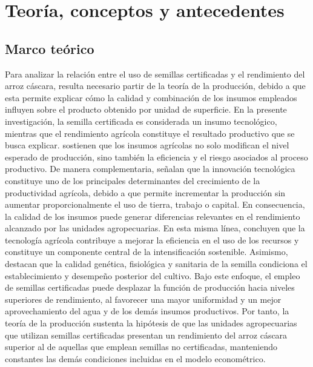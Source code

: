 \documentclass[11pt,a4paper,twocolumn]{article}
\begin{document}
\section{Teoría, conceptos y antecedentes}

\subsection{Marco teórico}
Para analizar la relación entre el uso de semillas certificadas y el rendimiento del arroz cáscara, resulta necesario partir de la teoría de la producción, debido a que esta permite explicar cómo la calidad y combinación de los insumos empleados influyen sobre el producto obtenido por unidad de superficie. En la presente investigación, la semilla certificada es considerada un insumo tecnológico, mientras que el rendimiento agrícola constituye el resultado productivo que se busca explicar. \citet{just1979} sostienen que los insumos agrícolas no solo modifican el nivel esperado de producción, sino también la eficiencia y el riesgo asociados al proceso productivo. De manera complementaria, \citet{alston2021} señalan que la innovación tecnológica constituye uno de los principales determinantes del crecimiento de la productividad agrícola, debido a que permite incrementar la producción sin aumentar proporcionalmente el uso de tierra, trabajo o capital. En consecuencia, la calidad de los insumos puede generar diferencias relevantes en el rendimiento alcanzado por las unidades agropecuarias. En esta misma línea, \citet{li2024} concluyen que la tecnología agrícola contribuye a mejorar la eficiencia en el uso de los recursos y constituye un componente central de la intensificación sostenible. Asimismo, \citet{louwaars2021} destacan que la calidad genética, fisiológica y sanitaria de la semilla condiciona el establecimiento y desempeño posterior del cultivo. Bajo este enfoque, el empleo de semillas certificadas puede desplazar la función de producción hacia niveles superiores de rendimiento, al favorecer una mayor uniformidad y un mejor aprovechamiento del agua y de los demás insumos productivos. Por tanto, la teoría de la producción sustenta la hipótesis de que las unidades agropecuarias que utilizan semillas certificadas presentan un rendimiento del arroz cáscara superior al de aquellas que emplean semillas no certificadas, manteniendo constantes las demás condiciones incluidas en el modelo econométrico.
\end{document}
